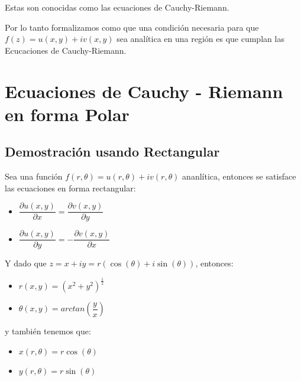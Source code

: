 \documentclass[12pt, fleqn]{report}                             %
\newcommand{\Wrap}[1]{\left( #1 \right)}                        %
\newcommand{\pfrac}[2]{\Wrap{\dfrac{#1}{#2}}}                   %
\newcommand{\Cos}[1]{\cos\Wrap{#1}}                             %
\newcommand{\Sin}[1]{\sin\Wrap{#1}}                             %
\newcommand \Partial[2] {\dfrac{\partial #1}{\partial #2}}      %
\newcommand \Cis[1]  {\Cos{#1} + i \Sin{#1}}                    %
\begin{document}
            Estas son conocidas como las ecuaciones de Cauchy-Riemann.

            Por lo tanto formalizamos como que una condición necesaria para que
            $f(z) = u(x, y) + iv (x, y)$ sea analítica en una región es que cumplan
            las Ecucaciones de Cauchy-Riemann.


        \clearpage
        \section{Ecuaciones de Cauchy - Riemann en forma Polar}

            \subsection{Demostración usando Rectangular}

                Sea una función $f(r, \theta) = u(r, \theta) + iv(r, \theta)$ ananlítica,
                entonces se satisface las ecuaciones en forma rectangular:

                \begin{itemize}
                    \item $\Partial{u(x, y)}{x} =   \Partial{v(x, y)}{y}$
                    \item $\Partial{u(x, y)}{y} = - \Partial{v(x, y)}{x}$
                \end{itemize}

                Y dado que $z = x + iy = r(\Cis{\theta})$, entonces:
                \begin{itemize}
                    \item $r(x, y) = \Wrap{x^2 + y^2}^{\frac{1}{2}}$
                    \item $\theta(x, y) = arctan\pfrac{y}{x}$
                \end{itemize}  

                y también tenemos que:
                \begin{itemize}
                    \item $x(r, \theta) = r\Cos{\theta}$
                    \item $y(r, \theta) = r\Sin{\theta}$
                \end{itemize}
\end{document}
